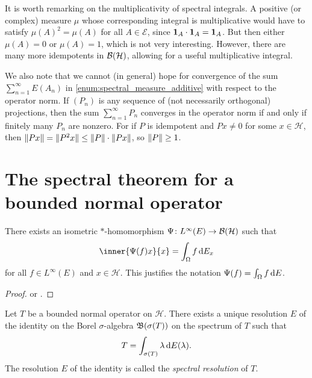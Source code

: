 \documentclass[article, a4paper, 11pt, oneside]{memoir}
\makeatletter
\numberwithin{equation}{chapter}
\newcommand{\calH}{\mathcal{H}}
\newcommand{\calE}{\mathcal{E}}
\theoremstyle{myexample}
\theoremstyle{myexample}
\theoremstyle{myexamplebreak}
\theoremstyle{myexamplebreak}
\theoremstyle{nonumberplain}
\newtheorem{proof}{\protect\@proof}
\theoremstyle{MyNonumberplain}
\newcommand{\@proof}{}
\renewcommand{\@proof}{Proof}%
\renewcommand{\@proof}{Bevis}%
\makeatother
\begin{document}
It is worth remarking on the multiplicativity of spectral integrals. A positive (or complex) measure $\mu$ whose corresponding integral is multiplicative would have to satisfy $\mu(A)^2 = \mu(A)$ for all $A \in \calE$, since $\mathbf{1}_{A} \cdot \mathbf{1}_{A} = \mathbf{1}_{A}$. But then either $\mu(A) = 0$ or $\mu(A) = 1$, which is not very interesting. However, there are many more idempotents in $\boundedop(\calH)$, allowing for a useful multiplicative integral.

We also note that we cannot (in general) hope for convergence of the sum $\sum_{n=1}^\infty E(A_n)$ in \cref{enum:spectral_measure_additive} with respect to the operator norm. If $(P_n)$ is any sequence of (not necessarily orthogonal) projections, then the sum $\sum_{n=1}^\infty P_n$ converges in the operator norm if and only if finitely many $P_n$ are nonzero. For if $P$ is idempotent and $Px \neq 0$ for some $x \in \calH$, then $\lVert Px\rVert = \lVert P^2 x\rVert \leq \lVert P\rVert \cdot \lVert Px\rVert$, so $\lVert P\rVert \geq 1$.


\section{The spectral theorem for a bounded normal operator}

\begin{theorem}
    \label{thm:spectral_integral_bounded}
    There exists an isometric $*$-homomorphism $\Psi\colon L^\infty(E) \to \boundedop(\calH)$ such that
    \begin{equation*}
        \inner{\Psi(f)x}{x}
            = \int_\Omega f \dif E_x
    \end{equation*}
    for all $f \in L^\infty(E)$ and $x \in \calH$. This justifies the notation $\Psi(f) = \int_\Omega f \mathop{}\!\mathrm{d} E$.
\end{theorem}

\begin{proof}
    \textcite[Theorem~12.21]{rudinfunctional} or \textcite[Theorem~3.56]{skibsted2019}.
\end{proof}


\begin{theorem}
    \label{thm:spectral_theorem_bounded}
    Let $T$ be a bounded normal operator on $\calH$. There exists a unique resolution $E$ of the identity on the Borel $\sigma$-algebra $\mathfrak{B}(\sigma(T))$ on the spectrum of $T$ such that
    \begin{equation*}
        T = \int_{\sigma(T)} \lambda \mathop{}\!\mathrm{d} E(\lambda).
    \end{equation*}
    The resolution $E$ of the identity is called the \emph{spectral resolution} of $T$.
\end{theorem}
\end{document}
